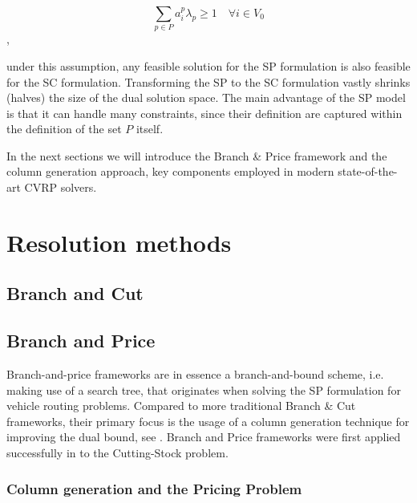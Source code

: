 \begin{equation}\label{eq:set-covering-customers-visited-by-exactly-one-route}
	\sum_{p \in P}  a_{i}^p \lambda_p \ge 1  \quad \forall i \in V_0
\end{equation},

under this assumption, any feasible solution for the SP formulation is also feasible for the SC formulation.
Transforming the SP to the SC formulation vastly shrinks (halves) the size of the dual solution space.
The main advantage of the SP model is that it can handle many constraints, since their definition are captured within the definition of the set $P$ itself.

In the next sections we will introduce the Branch \& Price framework and the column generation approach, key components employed in modern state-of-the-art CVRP solvers.



\section{Resolution methods}
\label{sec:intro-resolution-methods}

\subsection{Branch and Cut}
\label{sec:intro-branch-and-cut}


\subsection{Branch and Price}
\label{sec:intro-branch-and-price}

Branch-and-price frameworks are in essence a branch-and-bound scheme, i.e. making use of a search tree, that originates when solving the SP formulation for vehicle routing problems.
Compared to more traditional Branch \& Cut frameworks, their primary focus is the usage of a column generation technique for improving the dual bound, see \textcite{righini2008}.
Branch and Price frameworks were first applied successfully in \textcite{gilmore1961} to the Cutting-Stock problem.

\subsubsection{Column generation and the Pricing Problem}
\label{sec:column-generation-and-pricing-problem}

